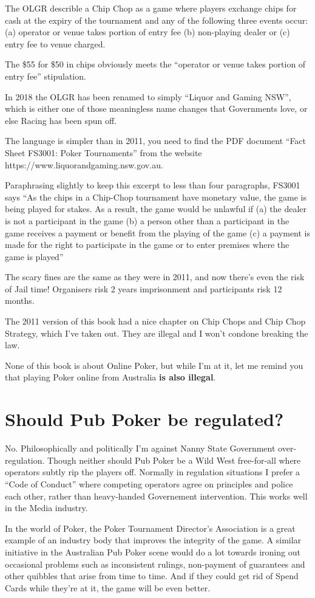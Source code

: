 The OLGR describle a Chip Chop as a game where players exchange chips for
cash at the expiry of the tournament and any of the following three
events occur: (a) operator or venue takes portion of entry fee
(b) non-playing dealer or (c) entry fee to venue charged.


The \$55 for \$50 in chips obviously meets the ``operator or venue takes
portion of entry fee'' stipulation.

In 2018 the OLGR has been renamed to simply
``Liquor and Gaming NSW'', which is either one of those meaningless
name changes that Governments love, or else Racing has been spun off.

The language is simpler than in 2011, you need to find
the PDF document ``Fact Sheet FS3001: Poker Tournaments'' from
the website https://www.liquorandgaming.nsw.gov.au.

Paraphrasing slightly to keep this excerpt to less than four paragraphs,
FS3001 says ``As the chips in a Chip-Chop tournament
have monetary value, the game is being played for stakes. As a result,
the game would be unlawful if (a) the dealer is not a participant in the game
(b) a person other than a participant in the game receives a payment
or benefit from the playing of the game (c) a payment is made for the
right to participate in the game or to enter premises where the game
is played''

The scary fines are the same as they were in 2011, and now there's even
the risk of Jail time! Organisers risk 2 years imprisonment and
participants risk 12 months.

The 2011 version of this book had a nice chapter on Chip Chops and
Chip Chop Strategy, which I've taken out. They are illegal and I
won't condone breaking the law.

None of this book is about Online Poker, but while I'm at it,
let me remind you that playing Poker online from Australia
\textbf{is also illegal}.

\section{Should Pub Poker be regulated?}

No. Philosophically and politically I'm against Nanny State
Government over-regulation. Though neither should Pub Poker
be a Wild West free-for-all where operators subtly rip the players
off. Normally in regulation situations I prefer a ``Code of Conduct''
where competing operators agree on principles and police each other,
rather than heavy-handed Governement intervention. This works well
in the Media industry.

In the world of Poker, the Poker Tournament Director's Association
is a great example of an industry body that improves the integrity
of the game. A similar initiative in the Australian Pub Poker scene
would do a lot towards ironing out occasional problems such as
inconsistent rulings, non-payment of guarantees and other quibbles
that arise from time to time. And if they could get rid of Spend Cards
while they're at it, the game will be even better.


